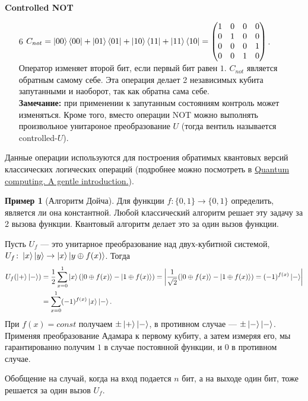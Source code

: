 \documentclass{article}
\theoremstyle{definition}
\newtheorem{example}{Пример}
\begin{document}
%
\textbf{Controlled NOT}
\begin{enumerate}
    \item[6] $C_{not} = \ket{00}\bra{00} + \ket{01}\bra{01} + \ket{10}\bra{11} + \ket{11}\bra{10} = 
    \begin{pmatrix}
    1 & 0 & 0 & 0 \\
    0 & 1 & 0 & 0 \\
    0 & 0 & 0 & 1 \\
    0 & 0 & 1 & 0 \\
    \end{pmatrix}$.\\
    Оператор изменяет второй бит, если первый бит равен $1$.
    $C_{not}$ является обратным самому себе.
    Эта операция делает 2 независимых кубита запутанными и наоборот, так как обратна сама себе.\\
    \textbf{Замечание:} при применении к запутанным состояниям контроль может изменяться.
    Кроме того, вместо операции NOT можно выполнять произвольное унитароное преобразование $U$
    (тогда вентиль называется controlled-$U$).
\end{enumerate}

Данные операции используются для построения обратимых квантовых версий классических логических операций
(подробнее можно посмотреть в
\href{http://csis.pace.edu/ctappert/cs837-19spring/Rieffel-Quantum%20Computing.pdf}{Quantum computing. A gentle introduction.}).



\begin{example}[Алгоритм Дойча]
Для функции $f \colon \{0, 1\} \rightarrow \{0, 1\}$ определить, является ли она константной.
Любой классический алгоритм решает эту задачу за 2 вызова функции.
Квантовый алгоритм делает это за один вызов функции.

Пусть $U_f$ --- это унитарное преобразование над двух-кубитной системой,
$U_f \colon \ket{x}\ket{y} \rightarrow \ket{x}\ket{y \oplus f(x)}$.
Тогда 
\begin{align*}
U_f(\ket{+}\ket{-})
&=
\frac12\sum_{x=0}^1 \ket{x}(\ket{0 \oplus f(x)} - \ket{1 \oplus f(x)}) 
= \left |
\frac{1}{\sqrt{2}}(\ket{0 \oplus f(x)} - \ket{1 \oplus f(x)}) = (-1)^{f(x)}\ket{-}
\right | \\
&= \sum_{x=0}^1 (-1)^{f(x)} \ket{x} \ket{-}.
\end{align*}
При $f(x) = const$ получаем $\pm \ket{+}\ket{-}$, в противном случае --- $\pm \ket{-}\ket{-}$.
Применяя преобразование Адамара к первому кубиту, а затем измеряя его, мы гарантированно получим
$1$ в случае постоянной функции, и $0$ в противном случае.

Обобщение на случай, когда на вход подается $n$ бит, а на выходе один бит, тоже решается за один вызов $U_f$.
\end{example}
\end{document}
